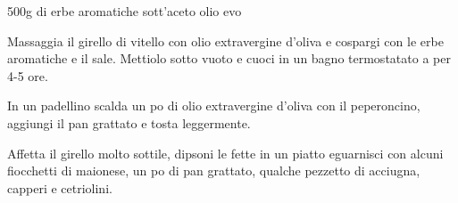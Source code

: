\begin{ingreds}
	500g di 
	erbe aromatiche
	 sott'aceto
	olio evo
\end{ingreds}

\begin{method}
Massaggia il girello di vitello con olio extravergine d'oliva e cospargi con le erbe aromatiche e il sale. Mettiolo sotto vuoto e cuoci in un bagno termostatato a  per 4-5 ore.

In un padellino scalda un po di olio extravergine d'oliva con il peperoncino, aggiungi il pan grattato e tosta leggermente.

Affetta il girello molto sottile, dipsoni le fette in un piatto eguarnisci con alcuni fiocchetti di maionese, un po di pan grattato, qualche pezzetto di acciugna, capperi e cetriolini.
\end {method}
